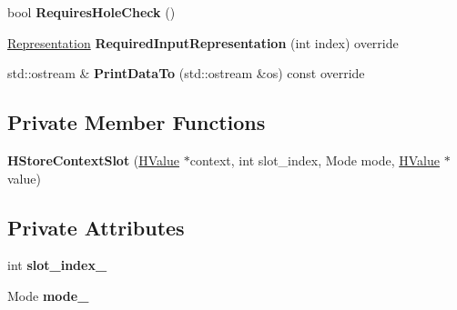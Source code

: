 \begin{DoxyCompactItemize}
\item 
bool {\bfseries Requires\+Hole\+Check} ()\hypertarget{classv8_1_1internal_1_1_h_store_context_slot_a4db9cb68084928b8ed92da422444d4bf}{}\label{classv8_1_1internal_1_1_h_store_context_slot_a4db9cb68084928b8ed92da422444d4bf}

\item 
\hyperlink{classv8_1_1internal_1_1_representation}{Representation} {\bfseries Required\+Input\+Representation} (int index) override\hypertarget{classv8_1_1internal_1_1_h_store_context_slot_abe7f887d34117408ae16b22d0c42da03}{}\label{classv8_1_1internal_1_1_h_store_context_slot_abe7f887d34117408ae16b22d0c42da03}

\item 
std\+::ostream \& {\bfseries Print\+Data\+To} (std\+::ostream \&os) const  override\hypertarget{classv8_1_1internal_1_1_h_store_context_slot_ac45ff1d0449740cab3af92df52d4b50d}{}\label{classv8_1_1internal_1_1_h_store_context_slot_ac45ff1d0449740cab3af92df52d4b50d}

\end{DoxyCompactItemize}
\subsection*{Private Member Functions}
\begin{DoxyCompactItemize}
\item 
{\bfseries H\+Store\+Context\+Slot} (\hyperlink{classv8_1_1internal_1_1_h_value}{H\+Value} $\ast$context, int slot\+\_\+index, Mode mode, \hyperlink{classv8_1_1internal_1_1_h_value}{H\+Value} $\ast$value)\hypertarget{classv8_1_1internal_1_1_h_store_context_slot_a83c8f3c98407c898cba3ddc2b28a2c6d}{}\label{classv8_1_1internal_1_1_h_store_context_slot_a83c8f3c98407c898cba3ddc2b28a2c6d}

\end{DoxyCompactItemize}
\subsection*{Private Attributes}
\begin{DoxyCompactItemize}
\item 
int {\bfseries slot\+\_\+index\+\_\+}\hypertarget{classv8_1_1internal_1_1_h_store_context_slot_a6173c74e8fb3972e2dfae60a060dbf3e}{}\label{classv8_1_1internal_1_1_h_store_context_slot_a6173c74e8fb3972e2dfae60a060dbf3e}

\item 
Mode {\bfseries mode\+\_\+}\hypertarget{classv8_1_1internal_1_1_h_store_context_slot_ae401e053e494099e58be156c3f28a850}{}\label{classv8_1_1internal_1_1_h_store_context_slot_ae401e053e494099e58be156c3f28a850}

\end{DoxyCompactItemize}
